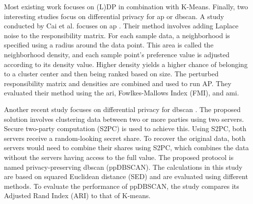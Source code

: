 Most existing work focuses on (L)DP in combination with K-Means.
Finally, two interesting studies focus on differential privacy for \gls{ap} or \gls{dbscan}.
A study conducted by Cai et al. focuses on \gls{ap} \citep{cai_dp-ap_2020}.
Their method involves adding Laplace noise to the responsibility matrix.
For each sample data, a neighborhood is specified using a radius around the data point.
This area is called the neighborhood density, and each sample point’s preference value is adjusted according to its density value.
Higher density yields a higher chance of belonging to a cluster center and then being ranked based on size.
The perturbed responsibility matrix and densities are combined and used to run AP.
They evaluated their method using the  \gls{ari}, Fowlkes-Mallows Index (FMI), and \gls{ami}.

Another recent study focuses on differential privacy for \gls{dbscan} \citep{bozdemir_privacy-preserving_nodate}.
The proposed solution involves clustering data between two or more parties using two servers.
Secure two-party computation (S2PC) is used to achieve this.
Using S2PC, both servers receive a random-looking secret share.
To recover the original data, both servers would need to combine their shares using S2PC, which combines the data without the servers having access to the full value.
The proposed protocol is named privacy-preserving \gls{dbscan} (ppDBSCAN).
The calculations in this study are based on squared Euclidean distance (SED) and are evaluated using different methods.
To evaluate the performance of ppDBSCAN, the study compares its Adjusted Rand Index (ARI) to that of K-means.

